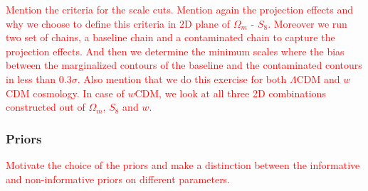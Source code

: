 \documentclass[fleqn,usenatbib]{mnras}
\newcommand{\red}[1]{\textcolor{red}{#1}}
\begin{document}
\red{Mention the criteria for the scale cuts. Mention again the projection effects and why we choose to define this criteria in 2D plane of $\Omega_m$ - $S_8$. Moreover we run two set of chains, a baseline chain and a contaminated chain to capture the projection effects. And then we determine the minimum scales where the bias between the marginalized contours of the baseline and the contaminated contours in less than $0.3\sigma$. Also mention that we do this exercise for both $\Lambda$CDM and $w$CDM cosmology. In case of $w$CDM, we look at all three 2D combinations constructed out of $\Omega_m$, $S_8$ and $w$.}



\subsubsection{Priors}
\red{Motivate the choice of the priors and make a distinction between the informative and non-informative priors on different parameters. }

 



\end{document}
